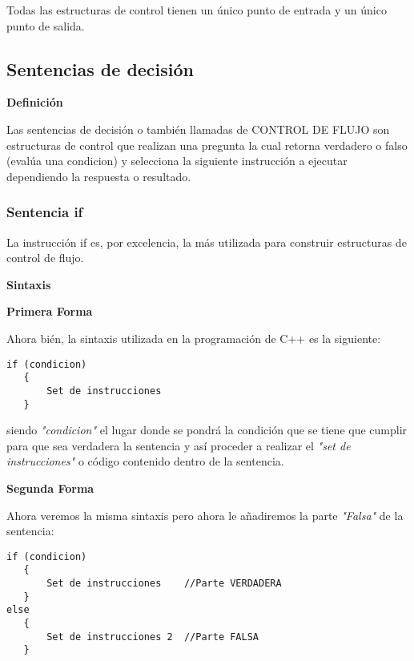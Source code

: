 Todas las estructuras de control tienen un único punto de entrada y un único punto de salida.


\subsection{Sentencias de decisión}

\begin{center}
	\textbf{Definición}
\end{center}

Las sentencias de decisión o también llamadas de CONTROL DE FLUJO son estructuras de control que realizan una pregunta la cual retorna verdadero o falso (evalúa una condicion) y selecciona la siguiente instrucción a ejecutar dependiendo la respuesta o resultado.


\subsubsection{Sentencia if}

La instrucción if es, por excelencia, la más utilizada para construir estructuras de control de flujo.

\begin{center}
	\textbf{Sintaxis}
\end{center}

\textbf{Primera Forma}

Ahora bién, la sintaxis utilizada en la programación de C++ es la siguiente:

\begin{lstlisting}[style=Cpp, label=sintaxis-if, caption=Sintaxis If]
if (condicion)
   {
       Set de instrucciones
   }
\end{lstlisting}

siendo \textit{"condicion"} el lugar donde se pondrá la condición que se tiene que cumplir para que sea verdadera la sentencia y así proceder a realizar el \textit{"set de instrucciones"} o código contenido dentro de la sentencia.

\textbf{Segunda Forma}

Ahora veremos la misma sintaxis pero ahora le añadiremos la parte \textit{"Falsa"} de la sentencia:

\begin{lstlisting}[style=Cpp, label=sintaxis-if-else, caption=Sintaxis If Else]
if (condicion)
   {
       Set de instrucciones    //Parte VERDADERA
   }
else
   {
       Set de instrucciones 2  //Parte FALSA
   }
\end{lstlisting}

